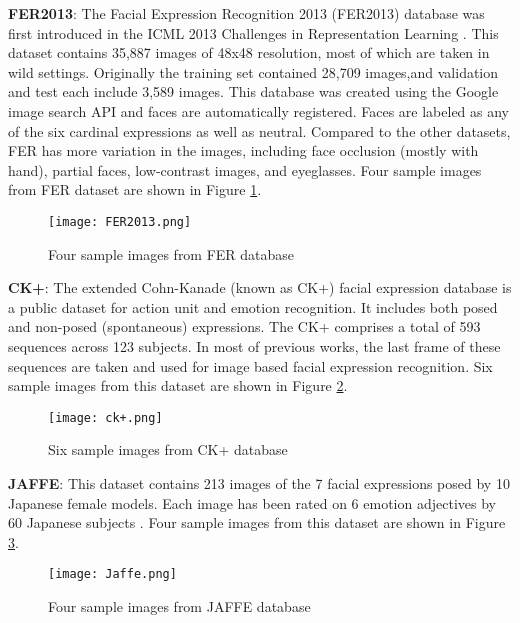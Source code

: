 \documentclass[conference]{IEEEtran}
\begin{document}
\textbf{FER2013}: The Facial Expression Recognition 2013 (FER2013) database was first introduced in the ICML 2013 Challenges in Representation Learning \cite{carrier2013fer}.
This dataset contains 35,887 images of 48x48 resolution, most of which are taken in wild settings. Originally the training set contained 28,709 images,and validation and test each include 3,589 images.
This database was created using the Google image search API and faces are automatically registered.
Faces are labeled as any of the six cardinal expressions as well as neutral.
Compared to the other datasets, FER has more variation in the images, including face occlusion (mostly with hand), partial faces, low-contrast images, and eyeglasses.
Four sample images from FER dataset are shown in Figure \ref{fig:FER}.
\begin{figure}[h]
\begin{center}
   \texttt{[image: FER2013.png]}
\end{center}
   \caption{Four sample images from FER database}
\label{fig:FER}
\end{figure}


\textbf{CK+}:
The extended Cohn-Kanade (known as CK+) facial expression database \cite{ckplus} is a public dataset for action unit and emotion recognition.
It includes both posed and non-posed (spontaneous) expressions.
The CK+ comprises a total of 593 sequences across 123 subjects.
In most of previous works, the last frame of these sequences are taken and used for image based facial expression recognition.
Six sample images from this dataset are shown in Figure \ref{fig:CKdata}.
\begin{figure}[h]
\begin{center}
   \texttt{[image: ck+.png]}
\end{center}
   \caption{Six sample images from CK+ database}
\label{fig:CKdata}
\end{figure}

\textbf{JAFFE}: This dataset contains 213 images of the 7 facial expressions posed by 10 Japanese female models. 
Each image has been rated on 6 emotion adjectives by 60 Japanese subjects \cite{lyons1998japanese}. 
Four sample images from this dataset are shown in Figure \ref{fig:JAFFE}.
\begin{figure}[h]
\begin{center}
   \texttt{[image: Jaffe.png]}
\end{center}
   \caption{Four sample images from JAFFE database}
\label{fig:JAFFE}
\end{figure}
\end{document}
